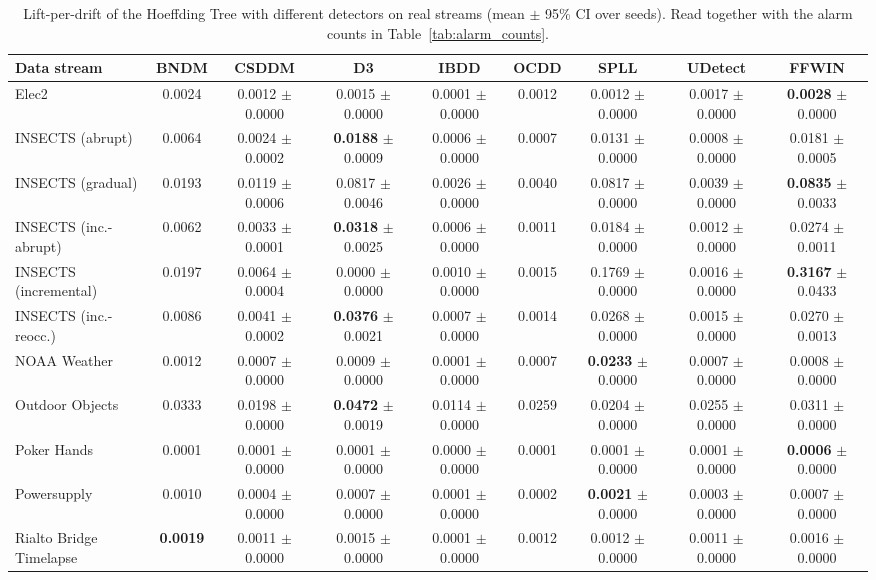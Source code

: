 \begin{table}[!t]
\centering
\caption{Lift-per-drift of the Hoeffding Tree with different detectors on real streams (mean $\pm$ 95\% CI over seeds). Read together with the alarm counts in Table~\ref{tab:alarm_counts}.}
\label{tab:lpd_ffwin}
\footnotesize
\setlength{\tabcolsep}{4pt}
\begin{tabular}{@{}lcccccccc@{}}
\toprule
\textbf{Data stream} & \textbf{BNDM} & \textbf{CSDDM} & \textbf{D3} & \textbf{IBDD} & \textbf{OCDD} & \textbf{SPLL} & \textbf{UDetect} & \textbf{FFWIN} \\
\midrule
Elec2 & 0.0024 & 0.0012 $\pm$ 0.0000 & 0.0015 $\pm$ 0.0000 & 0.0001 $\pm$ 0.0000 & 0.0012 & 0.0012 $\pm$ 0.0000 & 0.0017 $\pm$ 0.0000 & \textbf{0.0028} $\pm$ 0.0000 \\
INSECTS (abrupt) & 0.0064 & 0.0024 $\pm$ 0.0002 & \textbf{0.0188} $\pm$ 0.0009 & 0.0006 $\pm$ 0.0000 & 0.0007 & 0.0131 $\pm$ 0.0000 & 0.0008 $\pm$ 0.0000 & 0.0181 $\pm$ 0.0005 \\
INSECTS (gradual) & 0.0193 & 0.0119 $\pm$ 0.0006 & 0.0817 $\pm$ 0.0046 & 0.0026 $\pm$ 0.0000 & 0.0040 & 0.0817 $\pm$ 0.0000 & 0.0039 $\pm$ 0.0000 & \textbf{0.0835} $\pm$ 0.0033 \\
INSECTS (inc.-abrupt) & 0.0062 & 0.0033 $\pm$ 0.0001 & \textbf{0.0318} $\pm$ 0.0025 & 0.0006 $\pm$ 0.0000 & 0.0011 & 0.0184 $\pm$ 0.0000 & 0.0012 $\pm$ 0.0000 & 0.0274 $\pm$ 0.0011 \\
INSECTS (incremental) & 0.0197 & 0.0064 $\pm$ 0.0004 & 0.0000 $\pm$ 0.0000 & 0.0010 $\pm$ 0.0000 & 0.0015 & 0.1769 $\pm$ 0.0000 & 0.0016 $\pm$ 0.0000 & \textbf{0.3167} $\pm$ 0.0433 \\
INSECTS (inc.-reocc.) & 0.0086 & 0.0041 $\pm$ 0.0002 & \textbf{0.0376} $\pm$ 0.0021 & 0.0007 $\pm$ 0.0000 & 0.0014 & 0.0268 $\pm$ 0.0000 & 0.0015 $\pm$ 0.0000 & 0.0270 $\pm$ 0.0013 \\
NOAA Weather & 0.0012 & 0.0007 $\pm$ 0.0000 & 0.0009 $\pm$ 0.0000 & 0.0001 $\pm$ 0.0000 & 0.0007 & \textbf{0.0233} $\pm$ 0.0000 & 0.0007 $\pm$ 0.0000 & 0.0008 $\pm$ 0.0000 \\
Outdoor Objects & 0.0333 & 0.0198 $\pm$ 0.0000 & \textbf{0.0472} $\pm$ 0.0019 & 0.0114 $\pm$ 0.0000 & 0.0259 & 0.0204 $\pm$ 0.0000 & 0.0255 $\pm$ 0.0000 & 0.0311 $\pm$ 0.0000 \\
Poker Hands & 0.0001 & 0.0001 $\pm$ 0.0000 & 0.0001 $\pm$ 0.0000 & 0.0000 $\pm$ 0.0000 & 0.0001 & 0.0001 $\pm$ 0.0000 & 0.0001 $\pm$ 0.0000 & \textbf{0.0006} $\pm$ 0.0000 \\
Powersupply & 0.0010 & 0.0004 $\pm$ 0.0000 & 0.0007 $\pm$ 0.0000 & 0.0001 $\pm$ 0.0000 & 0.0002 & \textbf{0.0021} $\pm$ 0.0000 & 0.0003 $\pm$ 0.0000 & 0.0007 $\pm$ 0.0000 \\
Rialto Bridge Timelapse & \textbf{0.0019} & 0.0011 $\pm$ 0.0000 & 0.0015 $\pm$ 0.0000 & 0.0001 $\pm$ 0.0000 & 0.0012 & 0.0012 $\pm$ 0.0000 & 0.0011 $\pm$ 0.0000 & 0.0016 $\pm$ 0.0000 \\
\bottomrule
\end{tabular}
\end{table}
